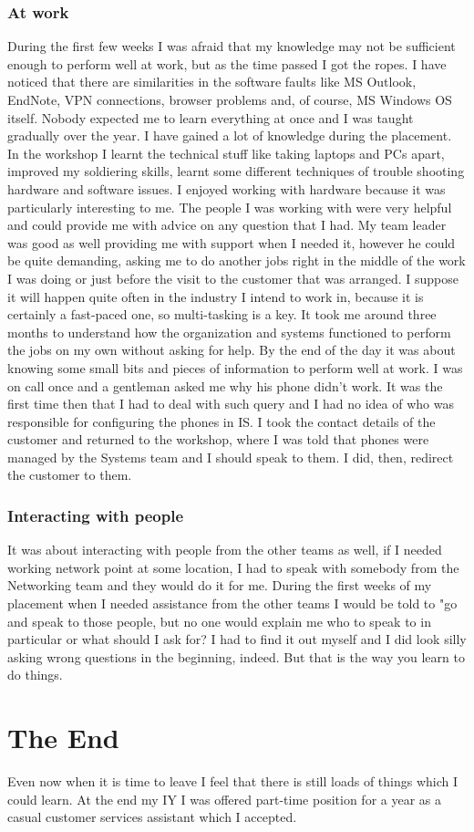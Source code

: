 \documentclass[10pt,a4paper,headinclude=true,twoside]{report}
\begin{document}
\subsubsection{At work}
During the first few weeks I was afraid that my knowledge may not be sufficient enough to perform well at work, but as the time passed I got the ropes. I have noticed that there are similarities in the software faults like MS Outlook, EndNote, VPN connections, browser problems and, of course, MS Windows OS itself. Nobody expected me to learn everything at once and I was taught gradually over the year. I have gained a lot of knowledge during the placement. In the workshop I learnt the technical stuff like taking laptops and PCs apart, improved my soldiering skills, learnt some different techniques of trouble shooting hardware and software issues. I enjoyed working with hardware because it was particularly interesting to me. The people I was working with were very helpful and could provide me with advice on any question that I had. My team leader was good as well providing me with support when I needed it, however he could be quite demanding, asking me to do another jobs right in the middle of the work I was doing or just before the visit to the customer that was arranged. I suppose it will happen quite often in the industry I intend to work in, because it is certainly a fast-paced one, so multi-tasking is a key. It took me around three months to understand how the organization and systems functioned to perform the jobs on my own without asking for help. By the end of the day it was about knowing some small bits and pieces of information to perform well at work. I was on call once and a gentleman asked me why his phone didn't work. It was the first time then that I had to deal with such query and I had no idea of who was responsible for configuring the phones in IS. I took the contact details of the customer and returned to the workshop, where I was told that phones were managed by the Systems team and I should speak to them. I did, then, redirect the customer to them.

\subsubsection{Interacting with people}
It was about interacting with people from the other teams as well, if I needed working network point at some location, I had to speak with somebody from the Networking team and they would do it for me. During the first weeks of my placement when I needed assistance from the other teams I would be told to "go and speak to those people, but no one would explain me who to speak to in particular or what should I ask for? I had to find it out myself and I did look silly asking wrong questions in the beginning, indeed. But that is the way you learn to do things.

\section{The End}
Even now when it is time to leave I feel that there is still loads of things which I could learn. At the end my IY I was offered part-time position for a year as a casual customer services assistant which I accepted. 



\end{document}
